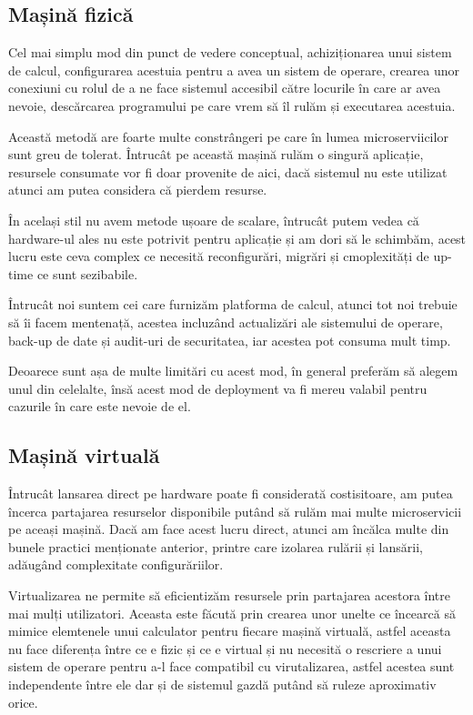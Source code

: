 \subsection{Mașină fizică}
Cel mai simplu mod din punct de vedere conceptual, achiziționarea unui sistem de calcul,
configurarea acestuia pentru a avea un sistem de operare, crearea unor conexiuni
cu rolul de a ne face sistemul accesibil către locurile în care ar avea nevoie, descărcarea
programului pe care vrem să îl rulăm și executarea acestuia.

Această metodă are foarte multe constrângeri pe care în lumea microserviicilor sunt greu de
tolerat. Întrucât pe această mașină rulăm o singură aplicație, resursele consumate
vor fi doar provenite de aici, dacă sistemul nu este utilizat atunci am putea considera
că pierdem resurse.

În același stil nu avem metode ușoare de scalare, întrucât putem vedea că hardware-ul ales
nu este potrivit pentru aplicație și am dori să le schimbăm, acest lucru este ceva complex
ce necesită reconfigurări, migrări și cmoplexități de up-time ce sunt sezibabile.

Întrucât noi suntem cei care furnizăm platforma de calcul, atunci tot noi trebuie să îi
facem mentenață, acestea incluzând actualizări ale sistemului de operare, back-up de date
și audit-uri de securitatea, iar acestea pot consuma mult timp.

Deoarece sunt așa de multe limitări cu acest mod, în general preferăm să alegem unul din celelalte,
însă acest mod de deployment va fi mereu valabil pentru cazurile în care este nevoie de el.

\subsection{Mașină virtuală}

Întrucât lansarea direct pe hardware poate fi considerată costisitoare, am putea încerca
partajarea resurselor disponibile putând să rulăm mai multe microservicii pe aceași
mașină. Dacă am face acest lucru direct, atunci am încălca multe din bunele practici menționate
anterior, printre care izolarea rulării și lansării, adăugând complexitate configurăriilor.

Virtualizarea ne permite să eficientizăm resursele prin partajarea acestora între mai mulți
utilizatori. Aceasta este făcută prin crearea unor unelte ce încearcă să mimice elemtenele
unui calculator pentru fiecare mașină virtuală, astfel aceasta nu face diferența între
ce e fizic și ce e virtual și nu necesită o rescriere a unui sistem de operare pentru a-l
face compatibil cu virutalizarea, astfel acestea sunt independente între ele dar și de sistemul
gazdă putând să ruleze aproximativ orice.

